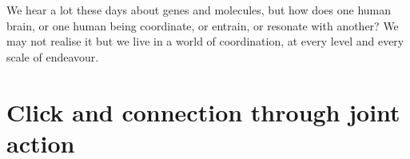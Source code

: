 
\begin{savequote}[8cm]

    We hear a lot these days about genes and molecules, but how does one human brain, or one human being coordinate, or entrain, or resonate with another?  We may not realise it but we live in a world of coordination, at every level and every scale of endeavour.

\end{savequote}




\chapter{\label{chap:theory}Click and connection through joint action}

\minitoc


